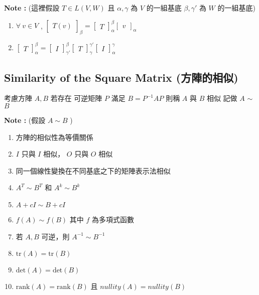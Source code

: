 \documentclass[
]{book}
\providecommand{\tightlist}{%
  \setlength{\itemsep}{0pt}\setlength{\parskip}{0pt}}
\begin{document}
\textbf{Note :} (這裡假設 \(T\in L(V,W)\) 且 \(\alpha, \gamma\) 為 \(V\) 的一組基底 \(\beta, \gamma'\) 為 \(W\) 的一組基底)

\begin{enumerate}
\def\labelenumi{\arabic{enumi}.}
\tightlist
\item
  \(\forall\ v \in V\) , \(\begin{bmatrix}T(v)\end{bmatrix} _{\beta} = \begin{bmatrix}T\end{bmatrix}_{\alpha}^{\beta}\begin{bmatrix}v\end{bmatrix}_{\alpha}\)
\item
  \(\begin{bmatrix}T\end{bmatrix}_{\alpha}^{\beta} = \begin{bmatrix}I\end{bmatrix}_{\gamma'}^{\beta}\begin{bmatrix}T\end{bmatrix}_{\gamma}^{\gamma'}\begin{bmatrix}I\end{bmatrix}_{\alpha}^{\gamma}\)
\end{enumerate}

\hypertarget{similarity-of-the-square-matrix-ux65b9ux9663ux7684ux76f8ux4f3c}{%
\subsection{Similarity of the Square Matrix (方陣的相似)}\label{similarity-of-the-square-matrix-ux65b9ux9663ux7684ux76f8ux4f3c}}

考慮方陣 \(A, B\) 若存在 可逆矩陣 \(P\) 滿足 \(B = P^{-1}AP\) 則稱 \(A\) 與 \(B\) 相似 記做 \(A\) \(\sim\) \(B\)

\textbf{Note :} (假設 \(A \sim B\) )

\begin{enumerate}
\def\labelenumi{\arabic{enumi}.}
\tightlist
\item
  方陣的相似性為等價關係
\item
  \(I\) 只與 \(I\) 相似， \(O\) 只與 \(O\) 相似
\item
  同一個線性變換在不同基底之下的矩陣表示法相似
\item
  \(A^T \sim B^T\) 和 \(A^k \sim B^k\)
\item
  \(A + cI \sim B + cI\)
\item
  \(f(A) \sim f(B)\) 其中 \(f\) 為多項式函數
\item
  若 \(A, B\) 可逆，則 \(A^{-1} \sim B^{-1}\)
\item
  \(\mbox{tr}(A) = \mbox{tr}(B)\)
\item
  \(\mbox{det}(A) = \mbox{det}(B)\)
\item
  \(\mbox{rank}(A) = \mbox{rank}(B)\) 且 \(nullity(A) = nullity(B)\)
\end{enumerate}
\end{document}
